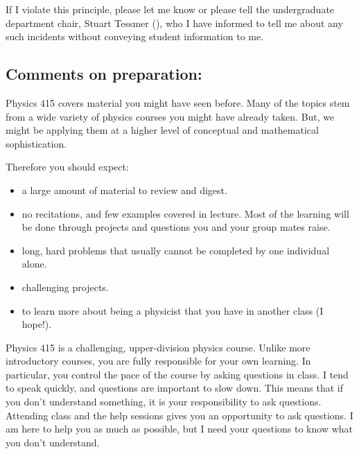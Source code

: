 \documentclass[letterpaper,10pt,english]{jupyterBook}
\begin{document}
\sphinxAtStartPar
{}

\sphinxAtStartPar
If I violate this principle, please let me know or please tell the undergraduate department chair, Stuart Tessmer (), who I have informed to tell me about any such incidents without conveying student information to me.


\subsection{Comments on preparation:}
\label{\detokenize{content/0_course/environment:comments-on-preparation}}
\sphinxAtStartPar
Physics 415 covers material you might have seen before. Many of the topics
stem from a wide variety of physics courses you might have already taken. But, we might be applying them at a higher level of conceptual and mathematical sophistication.

\sphinxAtStartPar
Therefore you should expect:
\begin{itemize}
\item {} 
\sphinxAtStartPar
a large amount of material to review and digest.

\item {} 
\sphinxAtStartPar
no recitations, and few examples covered in lecture. Most of the learning will be done through projects and questions you and your group mates raise.

\item {} 
\sphinxAtStartPar
long, hard problems that usually cannot be completed by one individual alone.

\item {} 
\sphinxAtStartPar
challenging projects.

\item {} 
\sphinxAtStartPar
to learn more about being a physicist that you have in another class (I hope!).

\end{itemize}

\sphinxAtStartPar
Physics 415 is a challenging, upper‐division physics course. Unlike more introductory courses, you are fully responsible for your own learning. In particular, you control the pace of the course by asking questions in class. I tend to speak quickly, and questions are important to slow down. This means that if you don’t understand something, it is your responsibility to ask questions. Attending class and the help sessions gives you an opportunity to ask questions. I am here to help you as much as possible, but I need your questions to know what you don’t understand.
\end{document}
